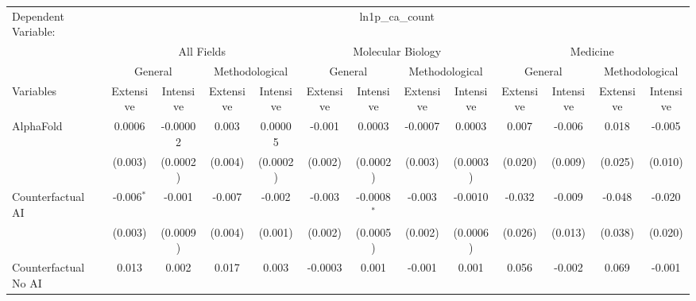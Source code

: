\begingroup
\centering
\begin{tabular}{lcccccccccccc}
   \tabularnewline \midrule \midrule
   Dependent Variable: & \multicolumn{12}{c}{ln1p\_ca\_count}\\
 & \multicolumn{4}{c}{All Fields} & \multicolumn{4}{c}{Molecular Biology} & \multicolumn{4}{c}{Medicine} \\
\cmidrule(lr){2-5} \cmidrule(lr){6-9} \cmidrule(lr){10-13}
 & \multicolumn{2}{c}{General} & \multicolumn{2}{c}{Methodological} & \multicolumn{2}{c}{General} & \multicolumn{2}{c}{Methodological} & \multicolumn{2}{c}{General} & \multicolumn{2}{c}{Methodological} \\
\cmidrule(lr){2-3} \cmidrule(lr){4-5} \cmidrule(lr){6-7} \cmidrule(lr){8-9} \cmidrule(lr){10-11} \cmidrule(lr){12-13}
Variables & \multicolumn{1}{c}{Extensive} & \multicolumn{1}{c}{Intensive} & \multicolumn{1}{c}{Extensive} & \multicolumn{1}{c}{Intensive} & \multicolumn{1}{c}{Extensive} & \multicolumn{1}{c}{Intensive} & \multicolumn{1}{c}{Extensive} & \multicolumn{1}{c}{Intensive} & \multicolumn{1}{c}{Extensive} & \multicolumn{1}{c}{Intensive} & \multicolumn{1}{c}{Extensive} & \multicolumn{1}{c}{Intensive} \\
\cmidrule(lr){1-1}\cmidrule(lr){2-2} \cmidrule(lr){3-3} \cmidrule(lr){4-4} \cmidrule(lr){5-5} \cmidrule(lr){6-6} \cmidrule(lr){7-7} \cmidrule(lr){8-8} \cmidrule(lr){9-9} \cmidrule(lr){10-10} \cmidrule(lr){11-11} \cmidrule(lr){12-12} \cmidrule(lr){13-13}
   AlphaFold                                & 0.0006       & -0.00002  & 0.003   & 0.00005   & -0.001  & 0.0003        & -0.0007 & 0.0003    & 0.007   & -0.006   & 0.018   & -0.005\\   
                                            & (0.003)      & (0.0002)  & (0.004) & (0.0002)  & (0.002) & (0.0002)      & (0.003) & (0.0003)  & (0.020) & (0.009)  & (0.025) & (0.010)\\   
   Counterfactual AI                        & -0.006$^{*}$ & -0.001    & -0.007  & -0.002    & -0.003  & -0.0008$^{*}$ & -0.003  & -0.0010   & -0.032  & -0.009   & -0.048  & -0.020\\   
                                            & (0.003)      & (0.0009)  & (0.004) & (0.001)   & (0.002) & (0.0005)      & (0.002) & (0.0006)  & (0.026) & (0.013)  & (0.038) & (0.020)\\   
   Counterfactual No AI                     & 0.013        & 0.002     & 0.017   & 0.003     & -0.0003 & 0.001         & -0.001  & 0.001     & 0.056   & -0.002   & 0.069   & -0.001\\   

\end{tabular}
